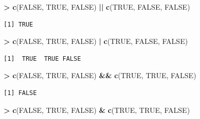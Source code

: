 \documentclass[]{krantz}
\makeatletter
\newenvironment{Shaded}{\begin{snugshade}}{\end{snugshade}}
\newcommand{\KeywordTok}[1]{\textcolor[rgb]{0.27,0.27,0.27}{\textbf{#1}}}
\newcommand{\StringTok}[1]{\textcolor[rgb]{0.5,0.5,0.5}{#1}}
\newcommand{\OtherTok}[1]{\textcolor[rgb]{0.37,0.37,0.37}{#1}}
\newcommand{\OperatorTok}[1]{\textcolor[rgb]{0.43,0.43,0.43}{\textbf{#1}}}
\newcommand{\NormalTok}[1]{#1}
\newenvironment{kframe}{%
\medskip{}
\setlength{\fboxsep}{.8em}
 \def\at@end@of@kframe{}%
 \ifinner\ifhmode%
  \def\at@end@of@kframe{\end{minipage}}%
  \begin{minipage}{\columnwidth}%
 \fi\fi%
 \def\FrameCommand##1{\hskip\@totalleftmargin \hskip-\fboxsep
 \colorbox{shadecolor}{##1}\hskip-\fboxsep
     \hskip-\linewidth \hskip-\@totalleftmargin \hskip\columnwidth}%
 \MakeFramed {\advance\hsize-\width
   \@totalleftmargin\z@ \linewidth\hsize
   \@setminipage}}%
 {\par\unskip\endMakeFramed%
 \at@end@of@kframe}
\renewenvironment{Shaded}{\begin{kframe}}{\end{kframe}}
\makeatother
\begin{document}
\begin{Shaded}
\begin{Highlighting}[]
\OperatorTok{>}\StringTok{ }\KeywordTok{c}\NormalTok{(}\OtherTok{FALSE}\NormalTok{, }\OtherTok{TRUE}\NormalTok{, }\OtherTok{FALSE}\NormalTok{) }\OperatorTok{||}\StringTok{ }\KeywordTok{c}\NormalTok{(}\OtherTok{TRUE}\NormalTok{, }\OtherTok{FALSE}\NormalTok{, }\OtherTok{FALSE}\NormalTok{)}
\end{Highlighting}
\end{Shaded}

\begin{verbatim}
[1] TRUE
\end{verbatim}

\begin{Shaded}
\begin{Highlighting}[]
\OperatorTok{>}\StringTok{ }\KeywordTok{c}\NormalTok{(}\OtherTok{FALSE}\NormalTok{, }\OtherTok{TRUE}\NormalTok{, }\OtherTok{FALSE}\NormalTok{) }\OperatorTok{|}\StringTok{ }\KeywordTok{c}\NormalTok{(}\OtherTok{TRUE}\NormalTok{, }\OtherTok{FALSE}\NormalTok{, }\OtherTok{FALSE}\NormalTok{)}
\end{Highlighting}
\end{Shaded}

\begin{verbatim}
[1]  TRUE  TRUE FALSE
\end{verbatim}

\begin{Shaded}
\begin{Highlighting}[]
\OperatorTok{>}\StringTok{ }\KeywordTok{c}\NormalTok{(}\OtherTok{FALSE}\NormalTok{, }\OtherTok{TRUE}\NormalTok{, }\OtherTok{FALSE}\NormalTok{) }\OperatorTok{&&}\StringTok{ }\KeywordTok{c}\NormalTok{(}\OtherTok{TRUE}\NormalTok{, }\OtherTok{TRUE}\NormalTok{, }\OtherTok{FALSE}\NormalTok{)}
\end{Highlighting}
\end{Shaded}

\begin{verbatim}
[1] FALSE
\end{verbatim}

\begin{Shaded}
\begin{Highlighting}[]
\OperatorTok{>}\StringTok{ }\KeywordTok{c}\NormalTok{(}\OtherTok{FALSE}\NormalTok{, }\OtherTok{TRUE}\NormalTok{, }\OtherTok{FALSE}\NormalTok{) }\OperatorTok{&}\StringTok{ }\KeywordTok{c}\NormalTok{(}\OtherTok{TRUE}\NormalTok{, }\OtherTok{TRUE}\NormalTok{, }\OtherTok{FALSE}\NormalTok{)}
\end{Highlighting}
\end{Shaded}
\end{document}
